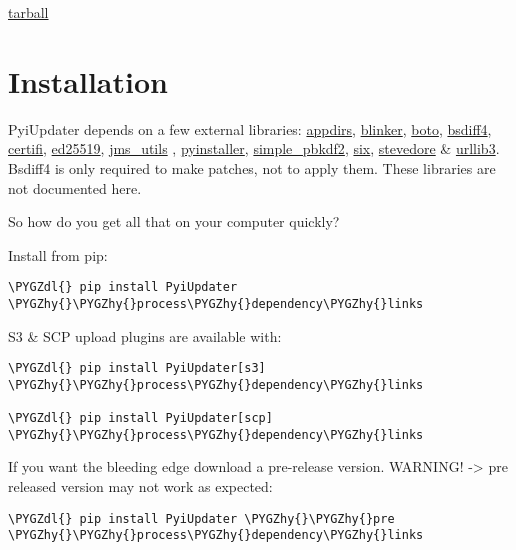 \documentclass[letterpaper,10pt,english]{sphinxmanual}
\def\PYGZdl{\char`\$}
\def\PYGZhy{\char`\-}
\begin{document}
\href{https://github.com/JohnyMoSwag/PyiUpdater/tarball/master}{tarball}


\section{Installation}
\label{installation:installation}\label{installation::doc}\label{installation:id1}
PyiUpdater depends on a few external libraries: \href{https://pypi.python.org/pypi/appdirs/}{appdirs}, \href{https://pypi.python.org/pypi/blinker}{blinker}, \href{http://aws.amazon.com/sdkforpython/}{boto},  \href{https://github.com/ilanschnell/bsdiff4}{bsdiff4}, \href{https://pypi.python.org/pypi/certifi}{certifi}, \href{https://pypi.python.org/pypi/ed25519}{ed25519}, \href{https://pypi.python.org/pypi/JMS-Utils}{jms\_utils} , \href{https://github.com/pyinstaller/pyinstaller}{pyinstaller}, \href{https://pypi.python.org/pypi/simple-pbkdf2}{simple\_pbkdf2}, \href{https://pypi.python.org/pypi/six}{six}, \href{https://pypi.python.org/pypi/stevedore}{stevedore} \& \href{https://pypi.python.org/pypi/urllib3}{urllib3}. Bsdiff4 is only required to make patches, not to apply them.  These libraries are not documented here.

So how do you get all that on your computer quickly?

Install from pip:

\begin{Verbatim}[commandchars=\\\{\}]
\PYGZdl{} pip install PyiUpdater \PYGZhy{}\PYGZhy{}process\PYGZhy{}dependency\PYGZhy{}links
\end{Verbatim}

S3 \& SCP upload plugins are available with:

\begin{Verbatim}[commandchars=\\\{\}]
\PYGZdl{} pip install PyiUpdater[s3] \PYGZhy{}\PYGZhy{}process\PYGZhy{}dependency\PYGZhy{}links

\PYGZdl{} pip install PyiUpdater[scp] \PYGZhy{}\PYGZhy{}process\PYGZhy{}dependency\PYGZhy{}links
\end{Verbatim}

If you want the bleeding edge download a pre-release version. WARNING! -\textgreater{} pre released version may not work as expected:

\begin{Verbatim}[commandchars=\\\{\}]
\PYGZdl{} pip install PyiUpdater \PYGZhy{}\PYGZhy{}pre \PYGZhy{}\PYGZhy{}process\PYGZhy{}dependency\PYGZhy{}links
\end{Verbatim}
\end{document}
